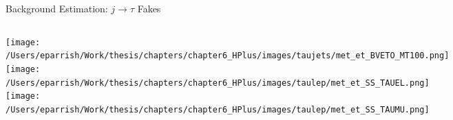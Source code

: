 \documentclass[aspectratio=169,xcolor=table]{beamer}
\begin{document}
\begin{frame}[t]{Background Estimation: $j \rightarrow \tau$ Fakes}
\begin{columns}[t]
      \centering
        \texttt{[image: /Users/eparrish/Work/thesis/chapters/chapter6\_HPlus/images/taujets/met\_et\_BVETO\_MT100.png]}
        \texttt{[image: /Users/eparrish/Work/thesis/chapters/chapter6\_HPlus/images/taulep/met\_et\_SS\_TAUEL.png]}
        \texttt{[image: /Users/eparrish/Work/thesis/chapters/chapter6\_HPlus/images/taulep/met\_et\_SS\_TAUMU.png]}
    \end{columns}
  \end{frame}





\end{document}
